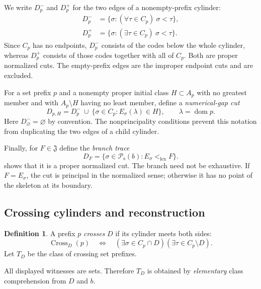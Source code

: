 \documentclass[11pt]{article}
\theoremstyle{definition}
\newtheorem{definition}[definition]{Definition}
\theoremstyle{remark}
\newcommand{\Jinj}{\mathfrak J}
\newcommand{\Psupp}{\mathcal P_{\mathrm{s}}}
\newcommand{\lex}{\mathrm{lex}}
\newcommand{\dom}{\operatorname{dom}}
\begin{document}
We write $D_p^-$ and $D_p^+$ for the two edges of a nonempty-prefix
cylinder:
\begin{align*}
 D_p^-&=\{\sigma:(\forall\tau\in C_p)\ \sigma<\tau\},\\
 D_p^+&=\{\sigma:(\exists\tau\in C_p)\ \sigma<\tau\}.
\end{align*}
Since $C_p$ has no endpoints, $D_p^-$ consists of the codes below the
whole cylinder, whereas $D_p^+$ consists of those codes together with
all of $C_p$. Both are proper normalized cuts. The empty-prefix edges
are the improper endpoint cuts and are excluded.

For a set prefix $p$ and a nonempty proper initial class $H\subset A_p$
with no greatest member and with $A_p\setminus H$ having no least
member, define a \emph{numerical-gap cut}
\[
 D_{p,H}=D_p^-\ \cup\
 \{\sigma\in C_p:E_\sigma(\lambda)\in H\},
 \qquad \lambda=\dom p.
\]
Here $D_\varnothing^-=\varnothing$ by convention. The nonprincipality
conditions prevent this notation from duplicating the two edges of a
child cylinder.

Finally, for $F\in \Jinj$ define the \emph{branch trace}
\[
 D_F=\{\sigma\in \Psupp(b):E_\sigma <_{\lex} F\}.
\]
 shows that it is a proper normalized cut.
The branch need not be exhaustive. If $F=E_\sigma$, the cut is principal
in the normalized sense; otherwise it has no point of the skeleton at
its boundary.

\subsection{Crossing cylinders and reconstruction}
\begin{definition}\label{swo:tc:n5.1}
A prefix $p$ \emph{crosses} $D$ if its cylinder meets both sides:
\[
 \operatorname{Cross}_D(p)\quad\Longleftrightarrow\quad
 (\exists\sigma\in C_p\cap D)(\exists\tau\in C_p\setminus D).
\]
Let $T_D$ be the class of crossing set prefixes.
\end{definition}
All displayed witnesses are sets. Therefore $T_D$ is obtained by
\emph{elementary} class comprehension from $D$ and $b$.
\end{document}
